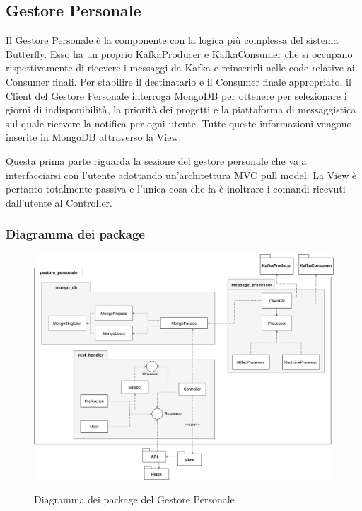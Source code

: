 \subsection{Gestore Personale}
Il Gestore Personale è la componente con la logica più complessa del sistema Butterfly. Esso ha un proprio KafkaProducer e KafkaConsumer
che si occupano rispettivamente di ricevere i messaggi da Kafka e reinserirli nelle code relative ai Consumer finali. Per stabilire il destinatario e il Consumer finale appropriato, il Client del Gestore Personale interroga MongoDB per ottenere per selezionare i giorni di indisponibilità, la priorità dei progetti e la piattaforma di messaggistica sul
quale ricevere la notifica per ogni utente. Tutte queste informazioni vengono inserite in MongoDB attraverso la View. \par
Questa prima parte riguarda la sezione del gestore personale che va a interfacciarsi con l’utente adottando un’architettura MVC pull model.
La View è pertanto totalmente passiva e l’unica cosa che fa è inoltrare i comandi ricevuti dall’utente al Controller.

\subsubsection{Diagramma dei package}

\begin{figure}[H]
    \centering
    \includegraphics[width=\textwidth]{img/Package-GestorePersonale.png}\\
    \caption{Diagramma dei package del Gestore Personale}
\end{figure}

